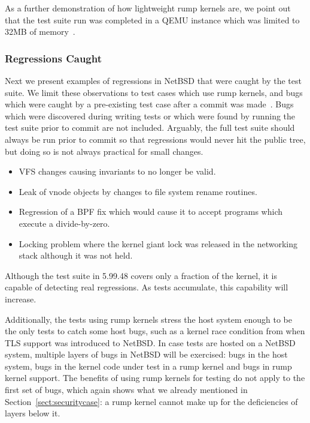 As a further demonstration of how lightweight rump kernels are, we
point out that the test suite run was completed in a QEMU instance
which was limited to 32MB of memory~\cite{gson:build}.

\subsubsection{Regressions Caught}

Next we present examples of regressions in NetBSD that were caught
by the test suite.  We limit these observations to test cases which
use rump kernels, and bugs which were caught by a pre-existing test
case after a commit was made~\cite{gson:build}.  Bugs which were
discovered during writing tests or which were found by running the
test suite prior to commit are not included.  Arguably, the full test
suite should always be run prior to commit so that regressions would
never hit the public tree, but doing so is not always practical
for small changes.

\begin{itemize}
\item   VFS changes causing invariants to no longer be valid.

\item   Leak of vnode objects by changes to file system rename
	routines.

\item   Regression of a BPF fix which would cause it to accept
	programs which execute a divide-by-zero.

\item   Locking problem where the kernel giant lock was released
	in the networking stack although it was not held.
\end{itemize}

Although the test suite in 5.99.48 covers only a fraction of the
kernel, it is capable of detecting real regressions.  As tests
accumulate, this capability will increase.

Additionally, the tests using rump kernels stress the host system
enough to be the only tests to catch some host bugs, such as a
kernel race condition from when TLS support was introduced to
NetBSD.  In case tests are hosted on a NetBSD system, multiple
layers of bugs in NetBSD will be exercised: bugs in the host system,
bugs in the kernel code under test in a rump kernel and bugs in rump
kernel support.  The benefits of using rump kernels for testing do
not apply to the first set of bugs, which again shows what we
already mentioned in Section~\ref{sect:securitycase}: a rump kernel
cannot make up for the deficiencies of layers below it.

